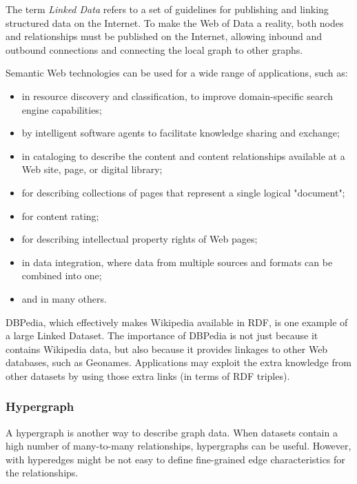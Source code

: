 The term \textit{Linked Data} refers to a set of guidelines for publishing and linking structured data on the Internet.
To make the Web of Data a reality, both nodes and relationships must be published on the Internet, allowing inbound and outbound connections and connecting the local graph to other graphs.

Semantic Web technologies can be used for a wide range of applications, such as:
 \begin{itemize}[noitemsep]
	\item in resource discovery and classification, to improve domain-specific search engine capabilities;
	\item by intelligent software agents to facilitate knowledge sharing and exchange;
	\item in cataloging to describe the content and content relationships available at a Web site, page, or digital library;
	\item for describing collections of pages that represent a single logical "document";
	\item for content rating;
	\item for describing intellectual property rights of Web pages;
	\item in data integration, where data from multiple sources and formats can be combined into one;
	\item and in many others.
\end{itemize}

DBPedia, which effectively makes Wikipedia available in RDF, is one example of a large Linked Dataset.
The importance of DBPedia is not just because it contains Wikipedia data, but also because it provides linkages to other Web databases, such as Geonames.
Applications may exploit the extra knowledge from other datasets by using those extra links (in terms of RDF triples).
\par
\subsubsection{Hypergraph} \label{subsubsection:LiteratureReview/ReviewofGraphDatabaseSystems/Graphdatamodels/Hypergraph}
A hypergraph is another way to describe graph data.
When datasets contain a high number of many-to-many relationships, hypergraphs can be useful.
However, with hyperedges might be not easy to define fine-grained edge characteristics for the relationships.

